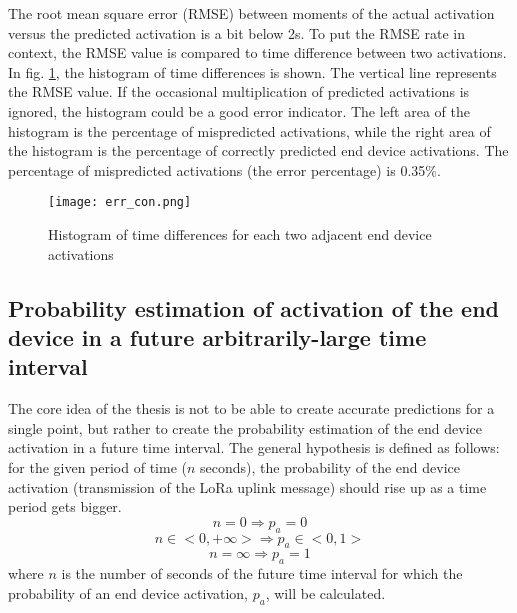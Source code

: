 The root mean square error (RMSE) between moments of the actual activation versus the predicted activation is a bit below 2s.
To put the RMSE rate in context, the RMSE value is compared to time difference between two activations.
In fig. \ref{fig:err_con}, the histogram of time differences is shown.
The vertical line represents the RMSE value.
If the occasional multiplication of predicted activations is ignored, the histogram could be a good error indicator.
The left area of the histogram is the percentage of mispredicted activations, while the right area of the histogram is the percentage of correctly predicted end device activations. 
The percentage of mispredicted activations (the error percentage) is 0.35\%.

\begin{figure}[H]
    \centering
    \texttt{[image: err\_con.png]}
    \caption{Histogram of time differences for each two adjacent end device activations}
    \label{fig:err_con}
\end{figure}

\subsection{Probability estimation of activation of the end device in a future arbitrarily-large time interval}
The core idea of the thesis is not to be able to create accurate predictions for a single point, but rather to create the probability estimation of the end device activation in a future time interval.
The general hypothesis is defined as follows: for the given period of time ($n$ seconds), the probability of the end device activation (transmission of the LoRa uplink message) should rise up as a time period gets bigger.
$$ n = 0 \Rightarrow p_{a} = 0 $$
$$ n \in <0, +\infty> \Rightarrow p_{a} \in <0, 1> $$
$$ n = \infty \Rightarrow p_{a} = 1 $$
where $n$ is the number of seconds of the future time interval for which the probability of an end device activation, $p_{a}$, will be calculated.

